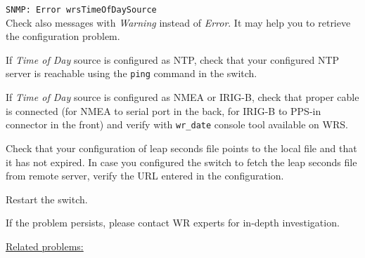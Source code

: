 {\begin{pck_proc}
        \texttt{SNMP: Error wrsTimeOfDaySource} \\
        Check also messages with \textit{Warning} instead of \textit{Error}.
        It may help you to retrieve the configuration problem.
      \item If \textit{Time of Day} source is configured as NTP, check that your
        configured NTP server is reachable using the \texttt{ping} command in
        the switch.
      \item If \textit{Time of Day} source is configured as NMEA or IRIG-B,
        check that proper cable is connected
        (for NMEA to serial port in the back,
        for IRIG-B to PPS-in connector in the front)
        and verify with \texttt{wr\_date} console tool available on WRS.
      \item Check that your configuration of leap seconds file points to the
	local file and that it has not expired. In case you configured the
	switch to fetch the leap seconds file from remote server, verify the URL
	entered in the configuration.
      \item Restart the switch.
      \item If the problem persists, please contact WR experts for in-depth
        investigation.        
    \end{pck_proc}
    \glspar \underline{Related problems:}}



